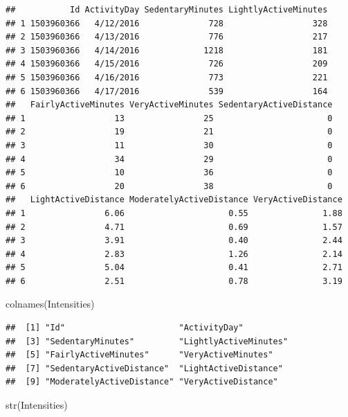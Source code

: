 \documentclass[
]{article}
\newenvironment{Shaded}{\begin{snugshade}}{\end{snugshade}}
\newcommand{\FunctionTok}[1]{\textcolor[rgb]{0.00,0.00,0.00}{#1}}
\newcommand{\NormalTok}[1]{#1}
\begin{document}
\begin{verbatim}
##           Id ActivityDay SedentaryMinutes LightlyActiveMinutes
## 1 1503960366   4/12/2016              728                  328
## 2 1503960366   4/13/2016              776                  217
## 3 1503960366   4/14/2016             1218                  181
## 4 1503960366   4/15/2016              726                  209
## 5 1503960366   4/16/2016              773                  221
## 6 1503960366   4/17/2016              539                  164
##   FairlyActiveMinutes VeryActiveMinutes SedentaryActiveDistance
## 1                  13                25                       0
## 2                  19                21                       0
## 3                  11                30                       0
## 4                  34                29                       0
## 5                  10                36                       0
## 6                  20                38                       0
##   LightActiveDistance ModeratelyActiveDistance VeryActiveDistance
## 1                6.06                     0.55               1.88
## 2                4.71                     0.69               1.57
## 3                3.91                     0.40               2.44
## 4                2.83                     1.26               2.14
## 5                5.04                     0.41               2.71
## 6                2.51                     0.78               3.19
\end{verbatim}

\begin{Shaded}
\begin{Highlighting}[]
\FunctionTok{colnames}\NormalTok{(Intensities)}
\end{Highlighting}
\end{Shaded}

\begin{verbatim}
##  [1] "Id"                       "ActivityDay"             
##  [3] "SedentaryMinutes"         "LightlyActiveMinutes"    
##  [5] "FairlyActiveMinutes"      "VeryActiveMinutes"       
##  [7] "SedentaryActiveDistance"  "LightActiveDistance"     
##  [9] "ModeratelyActiveDistance" "VeryActiveDistance"
\end{verbatim}

\begin{Shaded}
\begin{Highlighting}[]
\FunctionTok{str}\NormalTok{(Intensities)}
\end{Highlighting}
\end{Shaded}
\end{document}
